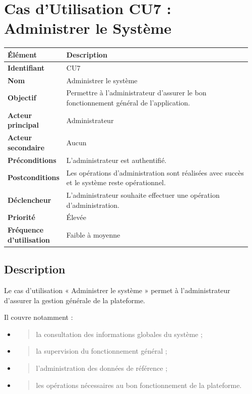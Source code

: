 \hypertarget{cas-dutilisation-cu7-administrer-le-systuxe8me}{%
\section{Cas d'Utilisation CU7 : Administrer le
Système}\label{cas-dutilisation-cu7-administrer-le-systuxe8me}}

\begin{longtable}{@{}p{0.18\linewidth}p{0.78\linewidth}@{}}
\toprule
\rowcolors{2}{gray!10}{white}
\textbf{Élément} & \textbf{Description} \\
\midrule
\endhead
\textbf{Identifiant} & CU7 \\
\textbf{Nom} & Administrer le système \\
\textbf{Objectif} & Permettre à l'administrateur d'assurer le bon
fonctionnement général de l'application. \\
\textbf{Acteur principal} & Administrateur \\
\textbf{Acteur secondaire} & Aucun \\
\textbf{Préconditions} & L'administrateur est authentifié. \\
\textbf{Postconditions} & Les opérations d'administration sont réalisées
avec succès et le système reste opérationnel. \\
\textbf{Déclencheur} & L'administrateur souhaite effectuer une opération
d'administration. \\
\textbf{Priorité} & Élevée \\
\textbf{Fréquence d'utilisation} & Faible à moyenne \\
\bottomrule
\end{longtable}

\hypertarget{description-5}{%
\subsection{Description}\label{description-5}}

Le cas d'utilisation « Administrer le système » permet à
l'administrateur d'assurer la gestion générale de la plateforme.

Il couvre notamment :

\begin{itemize}
\item
  \begin{quote}
  la consultation des informations globales du système ;
  \end{quote}
\item
  \begin{quote}
  la supervision du fonctionnement général ;
  \end{quote}
\item
  \begin{quote}
  l'administration des données de référence ;
  \end{quote}
\item
  \begin{quote}
  les opérations nécessaires au bon fonctionnement de la plateforme.
  \end{quote}
\end{itemize}

